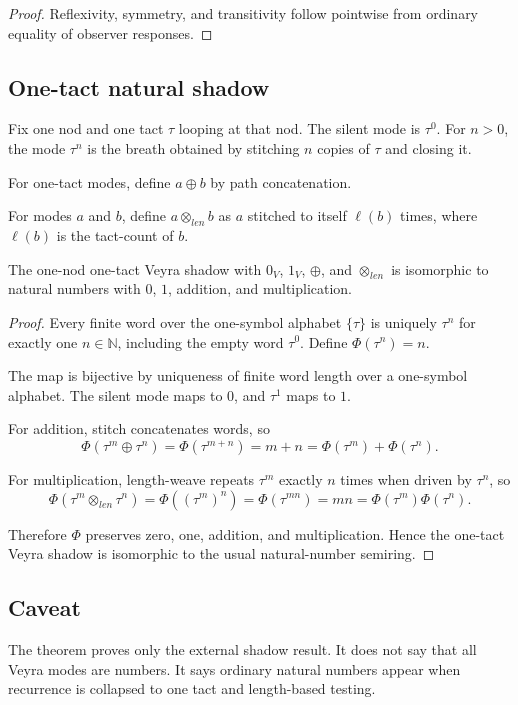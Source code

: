 \begin{proof}
Reflexivity, symmetry, and transitivity follow pointwise from ordinary equality of observer responses.
\end{proof}

\subsection{One-tact natural shadow}

\begin{definition}
Fix one nod and one tact $\tau$ looping at that nod. The silent mode is $\tau^0$. For $n>0$, the mode $\tau^n$ is the breath obtained by stitching $n$ copies of $\tau$ and closing it.
\end{definition}

\begin{definition}
For one-tact modes, define $a\oplus b$ by path concatenation.
\end{definition}

\begin{definition}
For modes $a$ and $b$, define $a\otimes_{len} b$ as $a$ stitched to itself $\ell(b)$ times, where $\ell(b)$ is the tact-count of $b$.
\end{definition}

\begin{theorem}
The one-nod one-tact Veyra shadow with $0_V$, $1_V$, $\oplus$, and $\otimes_{len}$ is isomorphic to natural numbers with $0$, $1$, addition, and multiplication.
\end{theorem}

\begin{proof}
Every finite word over the one-symbol alphabet $\{\tau\}$ is uniquely $\tau^n$ for exactly one $n\in\mathbb{N}$, including the empty word $\tau^0$. Define $\Phi(\tau^n)=n$.

The map is bijective by uniqueness of finite word length over a one-symbol alphabet. The silent mode maps to $0$, and $\tau^1$ maps to $1$.

For addition, stitch concatenates words, so
\[
\Phi(\tau^m\oplus\tau^n)=\Phi(\tau^{m+n})=m+n=\Phi(\tau^m)+\Phi(\tau^n).
\]

For multiplication, length-weave repeats $\tau^m$ exactly $n$ times when driven by $\tau^n$, so
\[
\Phi(\tau^m\otimes_{len}\tau^n)=\Phi((\tau^m)^n)=\Phi(\tau^{mn})=mn=\Phi(\tau^m)\Phi(\tau^n).
\]

Therefore $\Phi$ preserves zero, one, addition, and multiplication. Hence the one-tact Veyra shadow is isomorphic to the usual natural-number semiring.
\end{proof}

\subsection{Caveat}

The theorem proves only the external shadow result. It does not say that all Veyra modes are numbers. It says ordinary natural numbers appear when recurrence is collapsed to one tact and length-based testing.
